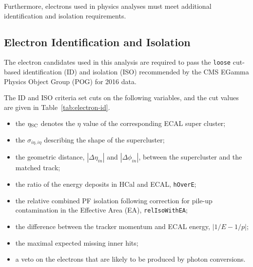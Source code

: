 \vspace{0.3cm}
Furthermore, electrons used in physics analyses must meet additional identification and isolation requirements.

\subsection{Electron Identification and Isolation}
The electron candidates used in this analysis are required to pass the \texttt{loose} cut-based identification (ID) and isolation (ISO) recommended by the CMS EGamma Physics Object Group (POG) for 2016 data.

The ID and ISO criteria set cuts on the following variables, and the cut values are given in Table~\ref{tab:electron-id}.

\begin{itemize}%
\item the $\eta_{\rm SC}$ denotes the $\eta$ value of the corresponding ECAL super cluster;
\item the $\sigma_{i\eta,i\eta}$ describing the shape of the supercluster;
\item the geometric distance, $|\Delta\eta_{in}|$ and $|\Delta\phi_{in}|$, between the supercluster and the matched track;
\item the ratio of the energy deposits in HCal and ECAL, \texttt{hOverE};
\item the relative combined PF isolation following correction for
  pile-up contamination in the
  Effective Area (EA), \texttt{relIsoWithEA}; %
\item the difference between the tracker momentum and ECAL energy, $|1/E-1/p|$;
\item the maximal expected missing inner hits;
\item a veto on the electrons that are likely to be produced by photon conversions.
\end{itemize}




